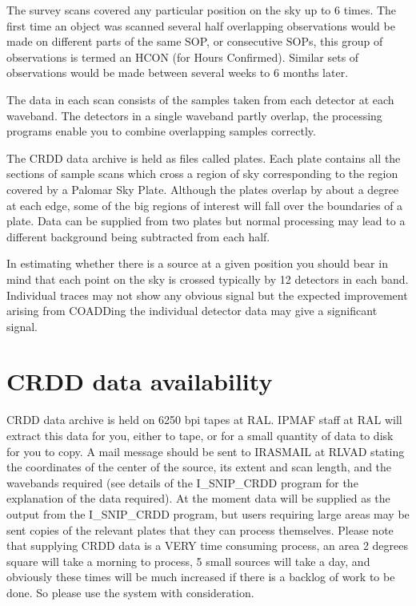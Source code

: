 \documentclass[nolof,noabs,11pt]{starlink}
\begin{document}
The survey scans covered any particular position on the sky up to 6 times. The
first time an object was scanned several half overlapping observations would be
made on different parts of the same SOP, or consecutive SOPs, this group of
observations is termed an HCON (for Hours Confirmed). Similar sets of
observations would be made between several weeks to 6 months later.

The data in each scan consists of the samples taken from each detector at each
waveband. The detectors in a single waveband partly overlap, the processing
programs enable you to combine overlapping samples correctly.

The CRDD data archive is held as files called plates. Each plate contains all
the sections of sample scans which cross a region of sky corresponding to the
region covered by a Palomar Sky Plate. Although the plates overlap by about a
degree at each edge, some of the big regions of interest will fall over the
boundaries of a plate. Data can be supplied from two plates but normal
processing may lead to a different background being subtracted from each half.

In estimating whether there is a source at a given position you should bear in
mind that each point on the sky is crossed typically by 12 detectors in each
band. Individual traces may not show any obvious signal but the expected
improvement arising from COADDing the individual detector data may give a
significant signal.

\section {CRDD data availability}

CRDD data archive is held on 6250 bpi tapes at RAL. IPMAF staff at RAL will
extract this data for you, either to tape, or for a small quantity of data to
disk for you to copy. A mail message should be sent to IRASMAIL at RLVAD
stating the coordinates of the center of the source, its extent and scan
length, and the wavebands required (see details of the I\_SNIP\_CRDD program
for the explanation of the data required). At the moment data will be supplied
as the output from the I\_SNIP\_CRDD program, but users requiring large areas
may be sent copies of the relevant plates that they can process themselves.
Please note that supplying CRDD data is a VERY time consuming
process, an area 2 degrees square will take a morning to process, 5 small
sources will take a day, and obviously these times will be much increased if
there is a backlog of work to be done. So please use the system with
consideration.
\end{document}
